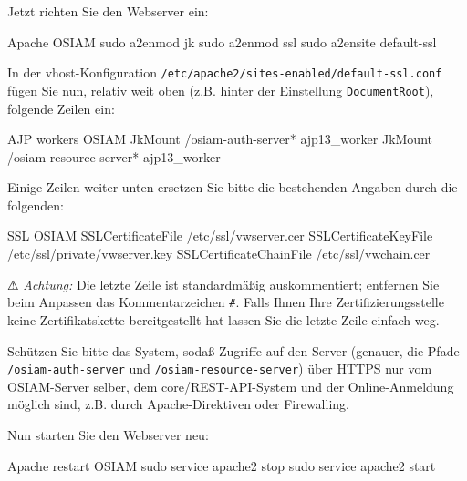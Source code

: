 \documentclass{tarentanleitung}
\begin{document}
\begin{minipage}{\linewidth}
Jetzt richten Sie den Webserver ein:

\begin{lstdump}{Apache OSIAM}
sudo a2enmod jk
sudo a2enmod ssl
sudo a2ensite default-ssl
\end{lstdump}
\end{minipage}

\begin{minipage}{\linewidth}
In der vhost-Konfiguration \texttt{/etc/apache2/sites-enabled/default-ssl.conf}
fügen Sie nun, relativ weit oben (z.B. hinter der Einstellung
\texttt{DocumentRoot}), folgende Zeilen ein:

\begin{lstdump}{AJP workers OSIAM}
JkMount /osiam-auth-server* ajp13_worker
JkMount /osiam-resource-server* ajp13_worker
\end{lstdump}
\end{minipage}

\begin{minipage}{\linewidth}
Einige Zeilen weiter unten ersetzen Sie bitte die bestehenden
Angaben durch die folgenden:

\begin{lstdump}{SSL OSIAM}
SSLCertificateFile /etc/ssl/vwserver.cer
SSLCertificateKeyFile /etc/ssl/private/vwserver.key
SSLCertificateChainFile /etc/ssl/vwchain.cer
\end{lstdump}

⚠ \emph{Achtung:} Die letzte Zeile ist standardmäßig auskommentiert;
entfernen Sie beim Anpassen das Kommentarzeichen \texttt{\#}. Falls
Ihnen Ihre Zertifizierungsstelle keine Zertifikatskette bereitgestellt
hat lassen Sie die letzte Zeile einfach weg.
\end{minipage}

Schützen Sie bitte das System, sodaß Zugriffe auf den Server (genauer,
die Pfade \texttt{/osiam-auth-server} und \texttt{/osiam-resource-server})
über HTTPS nur vom OSIAM-Server selber, dem core/REST-API-System und der
Online-Anmeldung möglich sind, z.B. durch Apache-Direktiven oder Firewalling.

\begin{minipage}{\linewidth}
Nun starten Sie den Webserver neu:

\begin{lstdump}{Apache restart OSIAM}
sudo service apache2 stop
sudo service apache2 start
\end{lstdump}
\end{minipage}
\end{document}
